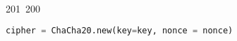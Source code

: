 201~200~\documentclass{article}
\begin{document}
\begin{lstlisting}[language=Python, caption=Cracking the key for Chall 2]
	                                                                        	                                                                    	                                	                    	                    	                        	                        	                    	                                                                	                	                                                                    	                    							                                                                                                                                                                                                    		                                            cipher = ChaCha20.new(key=key, nonce = nonce)       
	                                                                        	                                                                    	                                	                    	                    	                        	                        	                    	                                                                	                	                                                                    	                    							                                                                                                                                                                                                    		                                                size_n = ceil(RR(log(n,2))/8) 
	                                                                        	                                                                    	                                	                    	                    	                        	                        	                    	                                                                	                	                                                                    	                    							                                                                                                                                                                                                    		                                                    k = int.from_bytes(cipher.encrypt(b"\x00"*size_n))  # can calcualte

	                                                                        	                                                                    	                                	                    	                    	                        	                        	                    	                                                                	                	                                                                    	                    							                                                                                                                                                                                                    		                                                            a = F(s * k - h(m))/F(r)                            # Isolating the key


\end{lstlisting}
\end{document}
